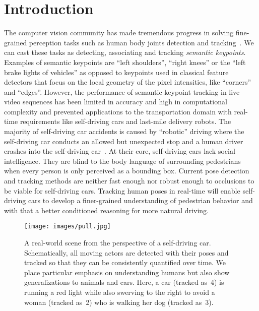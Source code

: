 \documentclass[journal]{IEEEtran}
\begin{document}
\IEEEpeerreviewmaketitle



\section{Introduction}

The computer vision community has made tremendous progress in solving fine-grained perception tasks such as human body joints detection and tracking~\cite{andriluka14cvpr,lin2014microsoft}. We can cast these tasks as detecting, associating and tracking \textit{semantic keypoints}. Examples of semantic keypoints are ``left shoulders'', ``right knees'' or the ``left brake lights of vehicles'' as opposed to keypoints used in classical feature detectors that focus on the local geometry of the pixel intensities, like ``corners'' and ``edges''.
However, the performance of semantic keypoint tracking in live video sequences has been limited in accuracy and high in computational complexity
and prevented applications to the transportation domain with real-time requirements like self-driving cars
and last-mile delivery robots.
The majority of self-driving car accidents is caused by ``robotic'' driving where
the self-driving car conducts an allowed but unexpected stop and a human driver crashes
into the self-driving car~\cite{crow2017howsafeareselfdrivingcars}.
At their core, self-driving cars lack social intelligence.
They are blind to the body language of surrounding pedestrians when every person is
only perceived as a bounding box.
Current pose detection and tracking methods are neither fast enough nor robust enough to occlusions to be viable for self-driving cars.
Tracking human poses in real-time will enable
self-driving cars to develop a finer-grained understanding of pedestrian behavior
and with that a better conditioned reasoning for more natural driving.

\begin{figure}[t]
  \centering
  \texttt{[image: images/pull.jpg]}
  \caption{
    A real-world scene from the perspective of a self-driving car. Schematically, all moving
    actors are detected with their poses and tracked so that they can
    be consistently quantified over time. We place particular emphasis on
    understanding humans but also show generalizations to animals and cars.
    Here, a car (tracked as~4) is running a red light while also swerving to
    the right to avoid a woman (tracked as~2) who is walking her
    dog (tracked as~3).
}
  \label{fig:pull}
\end{figure}
\end{document}
